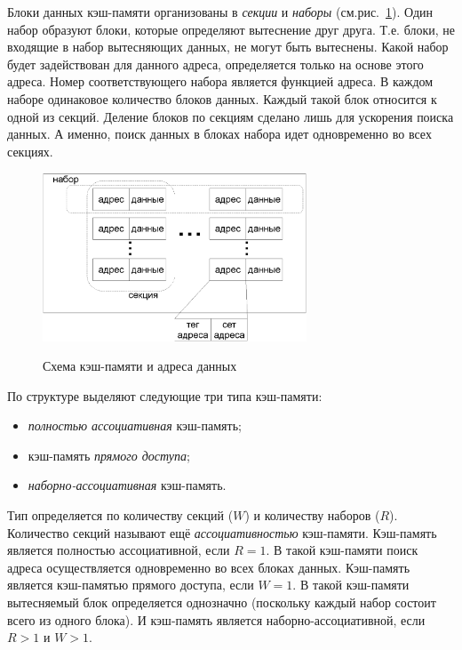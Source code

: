 \documentclass[14pt]{extreport}
\begin{document}
Блоки данных кэш-памяти организованы в \emph{секции} и \emph{наборы} (см.рис.~\ref{fig:cache_model}). Один набор образуют блоки, которые определяют вытеснение друг друга. Т.е. блоки, не входящие в набор вытесняющих данных, не могут быть вытеснены. Какой набор будет задействован для данного адреса, определяется только на основе этого адреса. Номер соответствующего набора является функцией адреса. В каждом наборе одинаковое количество блоков данных. Каждый такой блок относится к одной из секций. Деление блоков по секциям сделано лишь для ускорения поиска данных. А именно, поиск данных в блоках набора идет одновременно во всех секциях.

\begin{figure}[h] \center
  \includegraphics[width=0.7\textwidth]{1.review/cache}\\
  \caption{Схема кэш-памяти и адреса данных}\label{fig:cache_model}
\end{figure}

По структуре выделяют следующие три типа кэш-памяти:
\begin{itemize}
   \item \emph{полностью ассоциативная} кэш-память;
   \item кэш-память \emph{прямого доступа};
   \item \emph{наборно-ассоциативная} кэш-память.
\end{itemize}
Тип определяется по количеству секций ($W$) и количеству наборов ($R$). Количество секций называют ещё \emph{ассоциативностью} кэш-памяти. Кэш-память является полностью ассоциативной, если $R = 1$. В такой кэш-памяти поиск адреса осуществляется одновременно во всех блоках данных. Кэш-память является кэш-памятью прямого доступа, если $W = 1$. В такой кэш-памяти вытесняемый блок определяется однозначно (поскольку каждый набор состоит всего из одного блока). И кэш-память является наборно-ассоциативной, если $R > 1$ и $W > 1$.

\end{document}
